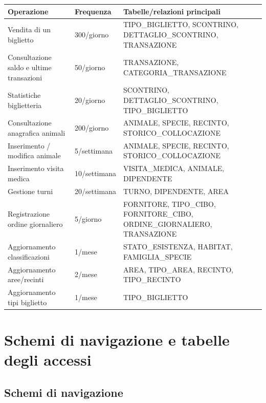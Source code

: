 \documentclass[12pt,a4paper]{report}
\begin{document}
\begin{longtable}{L{5cm} C{2.5cm} L{5.7cm}}
\toprule
\textbf{Operazione} & \textbf{Frequenza} & \textbf{Tabelle/relazioni principali} \\
\midrule
\endhead
Vendita di un biglietto & 300/giorno & TIPO\_BIGLIETTO, SCONTRINO, DETTAGLIO\_SCONTRINO, TRANSAZIONE \\
Consultazione saldo e ultime transazioni & 50/giorno & TRANSAZIONE, CATEGORIA\_TRANSAZIONE \\
Statistiche biglietteria & 20/giorno & SCONTRINO, DETTAGLIO\_SCONTRINO, TIPO\_BIGLIETTO \\
Consultazione anagrafica animali & 200/giorno & ANIMALE, SPECIE, RECINTO, STORICO\_COLLOCAZIONE \\
Inserimento / modifica animale & 5/settimana & ANIMALE, SPECIE, RECINTO, STORICO\_COLLOCAZIONE \\
Inserimento visita medica & 10/settimana & VISITA\_MEDICA, ANIMALE, DIPENDENTE \\
Gestione turni & 20/settimana & TURNO, DIPENDENTE, AREA \\
Registrazione ordine giornaliero & 5/giorno & FORNITORE, TIPO\_CIBO, FORNITORE\_CIBO, ORDINE\_GIORNALIERO, TRANSAZIONE \\
Aggiornamento classificazioni & 1/mese & STATO\_ESISTENZA, HABITAT, FAMIGLIA\_SPECIE \\
Aggiornamento aree/recinti & 2/mese & AREA, TIPO\_AREA, RECINTO, TIPO\_RECINTO \\
Aggiornamento tipi biglietto & 1/mese & TIPO\_BIGLIETTO \\
\bottomrule
\end{longtable}

\section{Schemi di navigazione e tabelle degli accessi}

\subsection{Schemi di navigazione}
\end{document}
